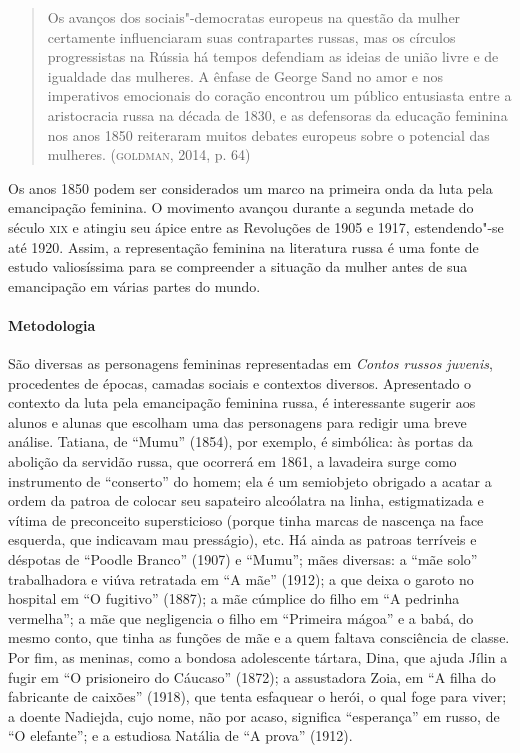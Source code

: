\documentclass[11pt]{extarticle}
\begin{document}
\begin{quote}
Os avanços dos sociais"-democratas europeus na questão da mulher
certamente influenciaram suas contrapartes russas, mas os círculos
progressistas na Rússia há tempos defendiam as ideias de união livre e
de igualdade das mulheres. A ênfase de George Sand no amor e nos
imperativos emocionais do coração encontrou um público entusiasta entre
a aristocracia russa na década de 1830, e as defensoras da educação
feminina nos anos 1850 reiteraram muitos debates europeus sobre o
potencial das mulheres. (\textsc{goldman}, 2014, p. 64)
\end{quote}

Os anos 1850 podem ser considerados um marco na primeira onda da luta
pela emancipação feminina. O movimento avançou durante a segunda metade
do século \textsc{xix} e atingiu seu ápice entre as Revoluções de 1905 e 1917,
estendendo"-se até 1920. Assim, a representação feminina na literatura
russa é uma fonte de estudo valiosíssima para se compreender a situação
da mulher antes de sua emancipação em várias partes do mundo.


\paragraph{Metodologia}
São diversas as personagens femininas representadas em \emph{Contos
russos juvenis}, procedentes de épocas, camadas sociais e contextos
diversos. Apresentado o contexto da luta pela emancipação feminina
russa, é interessante sugerir aos alunos e alunas que escolham uma das
personagens para redigir uma breve análise. Tatiana, de ``Mumu'' (1854),
por exemplo, é simbólica: às portas da abolição da servidão russa, que
ocorrerá em 1861, a lavadeira surge como instrumento de ``conserto'' do
homem; ela é um semiobjeto obrigado a acatar a ordem da patroa de
colocar seu sapateiro alcoólatra na linha, estigmatizada e vítima de
preconceito supersticioso (porque tinha marcas de nascença na face
esquerda, que indicavam mau presságio), etc. Há ainda as patroas
terríveis e déspotas de ``Poodle Branco'' (1907) e ``Mumu''; mães
diversas: a ``mãe solo'' trabalhadora e viúva retratada em ``A mãe''
(1912); a que deixa o garoto no hospital em ``O fugitivo'' (1887); a mãe
cúmplice do filho em ``A pedrinha vermelha''; a mãe que negligencia o
filho em ``Primeira mágoa'' e a babá, do mesmo conto, que tinha
as funções de mãe e a quem faltava consciência de classe. Por fim, as
meninas, como a bondosa adolescente tártara, Dina, que ajuda Jílin a
fugir em ``O prisioneiro do Cáucaso'' (1872); a assustadora Zoia,
em ``A filha do fabricante de caixões'' (1918), que tenta
esfaquear o herói, o qual foge para viver; a doente Nadiejda, cujo nome,
não por acaso, significa ``esperança'' em russo, de ``O
elefante''; e a estudiosa Natália de ``A prova'' (1912).
\end{document}
